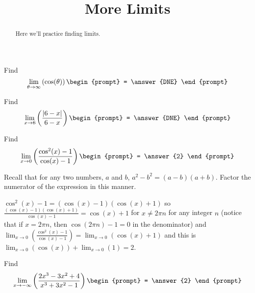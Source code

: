\documentclass[handout]{ximera}
\title{More Limits}
\begin{document}
\begin{abstract}
  Here we'll practice finding limits.
\end{abstract}
\maketitle

\begin{exercise}
Find
\[
\lim_{\theta\to\infty}\left(\cos(\theta)\right)
\begin{prompt}
= \answer{DNE}
\end{prompt}
\]

\end{exercise}


\begin{exercise}
Find
\[
\lim_{x\to6}\left(\frac{\left|6-x\right|}{6-x}\right)
\begin{prompt}
= \answer{DNE}
\end{prompt}
\]

\end{exercise}

\begin{exercise}
Find
\[
\lim_{x\to0}\left(\frac{\cos^{2}(x)-1}{\cos(x)-1}\right)
\begin{prompt}
= \answer{2}
\end{prompt}
\]

\begin{hint}
Recall that for any two numbers, $a$ and $b$,  $a^2-b^2=(a-b)(a+b)$. Factor the numerator of the expression in this manner.
\end{hint}
\begin{hint}
$\cos^{2}(x)-1=(\cos(x)-1)(\cos(x)+1)$ so $\frac{(\cos(x)-1)(\cos(x)+1)}{\cos(x)-1}=\cos(x)+1$ for $x\ne2\pi{n}$ for any integer $n$ (notice that if $x=2\pi n$, then $\cos(2\pi n)-1=0$ in the denominator) and $\lim_{x\to0}\left(\frac{\cos^{2}(x)-1}{\cos(x)-1}\right)=\lim_{x\to0}\left(\cos(x)+1\right)$ and this is $\lim_{x\to0}\left(\cos(x)\right)+\lim_{x\to0}\left(1\right)=2$.

\end{hint}
\end{exercise}

\begin{exercise}
Find
\[
\lim_{x\to-\infty}\left(\frac{2x^3-3x^2+4}{x^3+3x^2-1}\right)
\begin{prompt}
= \answer{2}
\end{prompt}
\]

\end{exercise}
\end{document}
